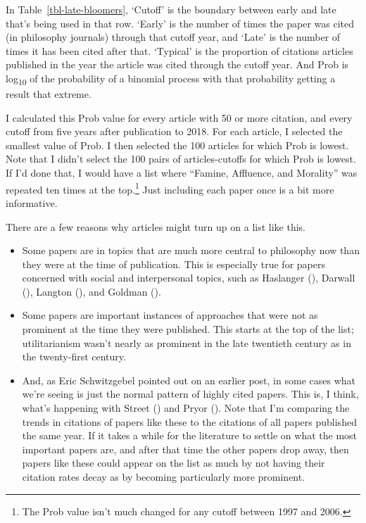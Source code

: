 \documentclass[
  10pt,
  letterpaper,
  DIV=11,
  numbers=noendperiod,
  twoside]{scrartcl}
\providecommand{\tightlist}{%
  \setlength{\itemsep}{0pt}\setlength{\parskip}{0pt}}\usepackage{longtable,booktabs,array}
\begin{document}
In Table~\ref{tbl-late-bloomers}, `Cutoff' is the boundary between early
and late that's being used in that row. `Early' is the number of times
the paper was cited (in philosophy journals) through that cutoff year,
and `Late' is the number of times it has been cited after that.
`Typical' is the proportion of citations articles published in the year
the article was cited through the cutoff year. And Prob is
log\textsubscript{10} of the probability of a binomial process with that
probability getting a result that extreme.

I calculated this Prob value for every article with 50 or more citation,
and every cutoff from five years after publication to 2018. For each
article, I selected the smallest value of Prob. I then selected the 100
articles for which Prob is lowest. Note that I didn't select the 100
pairs of articles-cutoffs for which Prob is lowest. If I'd done that, I
would have a list where ``Famine, Affluence, and Morality'' was repeated
ten times at the top.\footnote{The Prob value isn't much changed for any
  cutoff between 1997 and 2006.} Just including each paper once is a bit
more informative.

There are a few reasons why articles might turn up on a list like this.

\begin{itemize}
\tightlist
\item
  Some papers are in topics that are much more central to philosophy now
  than they were at the time of publication. This is especially true for
  papers concerned with social and interpersonal topics, such as
  Haslanger (), Darwall
  (), Langton
  (), and Goldman
  ().
\item
  Some papers are important instances of approaches that were not as
  prominent at the time they were published. This starts at the top of
  the list; utilitarianism wasn't nearly as prominent in the late
  twentieth century as in the twenty-first century.
\item
  And, as Eric Schwitzgebel pointed out on an earlier post, in some
  cases what we're seeing is just the normal pattern of highly cited
  papers. This is, I think, what's happening with Street
  () and Pryor
  (). Note that I'm comparing the
  trends in citations of papers like these to the citations of all
  papers published the same year. If it takes a while for the literature
  to settle on what the most important papers are, and after that time
  the other papers drop away, then papers like these could appear on the
  list as much by not having their citation rates decay as by becoming
  particularly more prominent.
\end{itemize}
\end{document}
